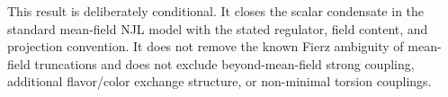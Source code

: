 \documentclass[aps,prd,twocolumn,superscriptaddress,showpacs,preprintnumbers,nofootinbib,longbibliography,floatfix]{revtex4-2}
\begin{document}
This result is deliberately conditional.  It closes the scalar condensate in
the standard mean-field NJL model with the stated regulator, field content,
and projection convention.  It does not remove the known Fierz ambiguity of
mean-field truncations and does not exclude beyond-mean-field strong coupling,
additional flavor/color exchange structure, or non-minimal torsion couplings.

\end{document}
